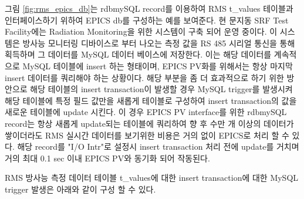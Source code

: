 \documentclass[11pt
  , a4paper
  , article
  , oneside
]{memoir}
\begin{document}
그림 \ref{fig:rms_epics_db}는 rdbmySQL record를 이용하여 RMS t\_values 테이블과 인터페이스하기 위하여 EPICS db를 구성하는 예를 보여준다. 현 문지동 SRF Test Facility에는 Radiation Monitoring을 위한 시스템이 구축 되어 운영 중이다. 이 시스템은 방사능 모니터링 디바이스로 부터 나오는 측정 값을 RS 485 시리얼 통신을 통해 획득하며 그 데이터를 MySQL 데이터 베이스에 저장한다. 이는 해당 데이터를 계속적으로 MySQL 테이블에 insert 하는 형태이며, EPICS PV화를 위해서는 항상 마지막 insert 데이터를 쿼리해야 하는 상황이다. 해당 부분을 좀 더 효과적으로 하기 위한 방안으로 해당 테이블의 insert transaction이 발생할 경우 MySQL trigger를 발생시켜 해당 테이블에 특정 필드 값만을 새롭게 테이블로 구성하여 insert transaction의 값을 새로운 테이블에 update 시킨다. 이 경우 EPICS PV interface를 위한 rdbmySQL record는 항상 새롭게 update되는 테이블에 쿼리하여 향 후 수만 개 이상의 데이터가 쌓이더라도 RMS 실시간 데이터를 보기위한 비용은 거의 없이 EPICS로 처리 할 수 있다. 해당 record를 "I/O Intr"로 설정시 insert transaction 처리 전에 update를 거치며 거의 최대 0.1 sec 이내 EPICS PV와 동기화 되어 작동된다.

RMS 방사능 측정 데이터 테이블 t\_values에 대한 insert transaction에 대한 MySQL trigger 발생은 아래와 같이 구성 할 수 있다.
\end{document}
